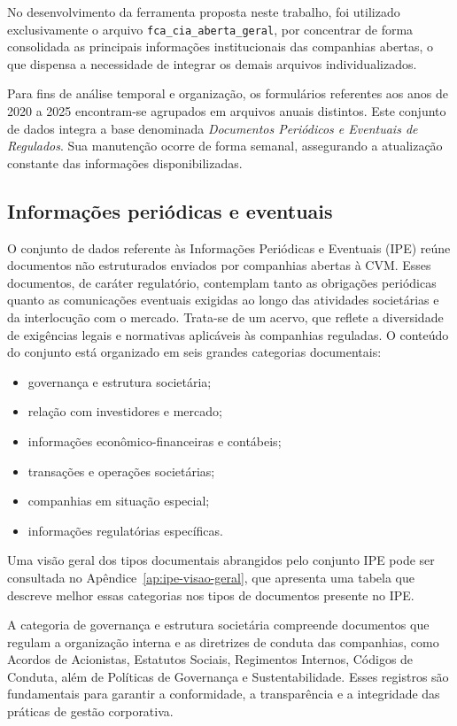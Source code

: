 No desenvolvimento da ferramenta proposta neste trabalho, foi utilizado exclusivamente o arquivo \texttt{fca\_cia\_aberta\_geral}, por concentrar de forma consolidada as principais informações institucionais das companhias abertas, o que dispensa a necessidade de integrar os demais arquivos individualizados.

Para fins de análise temporal e organização, os formulários referentes aos anos de 2020 a 2025 encontram-se agrupados em arquivos anuais distintos. Este conjunto de dados integra a base denominada \textit{Documentos Periódicos e Eventuais de Regulados}. Sua manutenção ocorre de forma semanal, assegurando a atualização constante das informações disponibilizadas.

\subsection{Informações periódicas e eventuais}

O conjunto de dados referente às Informações Periódicas e Eventuais (IPE) reúne documentos não estruturados enviados por companhias abertas à CVM. Esses documentos, de caráter regulatório, contemplam tanto as obrigações periódicas quanto as comunicações eventuais exigidas ao longo das atividades societárias e da interlocução com o mercado. Trata-se de um acervo, que reflete a diversidade de exigências legais e normativas aplicáveis às companhias reguladas. O conteúdo do conjunto está organizado em seis grandes categorias documentais:

\begin{itemize}
	\item governança e estrutura societária;
	\item relação com investidores e mercado;
	\item informações econômico-financeiras e contábeis;
	\item transações e operações societárias;
	\item companhias em situação especial;
	\item informações regulatórias específicas.
\end{itemize}

Uma visão geral dos tipos documentais abrangidos pelo conjunto IPE pode ser consultada no Apêndice~\ref{ap:ipe-visao-geral}, que apresenta uma tabela que descreve melhor essas categorias nos tipos de documentos presente no IPE.

A categoria de governança e estrutura societária compreende documentos que regulam a organização interna e as diretrizes de conduta das companhias, como Acordos de Acionistas, Estatutos Sociais, Regimentos Internos, Códigos de Conduta, além de Políticas de Governança e Sustentabilidade. Esses registros são fundamentais para garantir a conformidade, a transparência e a integridade das práticas de gestão corporativa. 

